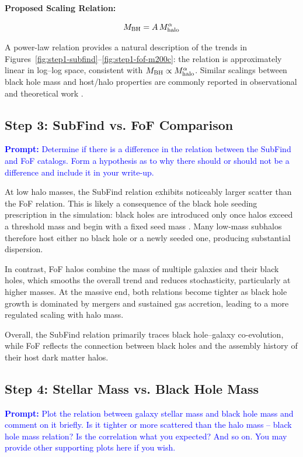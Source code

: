 \documentclass[twocolumn]{aastex631}
\begin{document}
\textbf{Proposed Scaling Relation:}

\begin{equation}
M_{\rm BH} = A\, M_{\rm halo}^{\alpha}
\end{equation}

A power-law relation provides a natural description of the trends in Figures~\ref{fig:step1-subfind}--\ref{fig:step1-fof-m200c}: the relation is approximately linear in log--log space, consistent with $M_{\rm BH}\propto M_{\rm halo}^{\alpha}$. Similar scalings between black hole mass and host/halo properties are commonly reported in observational and theoretical work \citep{2002ApJ...578...90F}.

\subsection{Step 3: SubFind vs. FoF Comparison}
\textcolor{blue}{\textbf{Prompt:} Determine if there is a difference in the relation between the SubFind and FoF catalogs. Form a hypothesis as to why there should or should not be a difference and include it in your write-up.}

At low halo masses, the SubFind relation exhibits noticeably larger scatter than the FoF relation. This is likely a consequence of the black hole seeding prescription in the simulation: black holes are introduced only once halos exceed a threshold mass and begin with a fixed seed mass \citep{Weinberger2017TNG_BHFB}. Many low-mass subhalos therefore host either no black hole or a newly seeded one, producing substantial dispersion.

In contrast, FoF halos combine the mass of multiple galaxies and their black holes, which smooths the overall trend and reduces stochasticity, particularly at higher masses. At the massive end, both relations become tighter as black hole growth is dominated by mergers and sustained gas accretion, leading to a more regulated scaling with halo mass.

Overall, the SubFind relation primarily traces black hole--galaxy co-evolution, while FoF reflects the connection between black holes and the assembly history of their host dark matter halos.

\subsection{Step 4: Stellar Mass vs. Black Hole Mass}
\textcolor{blue}{\textbf{Prompt:} Plot the relation between galaxy stellar mass and black hole mass and comment on it briefly. Is it tighter or more scattered than the halo mass -- black hole mass relation? Is the correlation what you
expected? And so on. You may provide other supporting plots here if you wish.}
\end{document}
